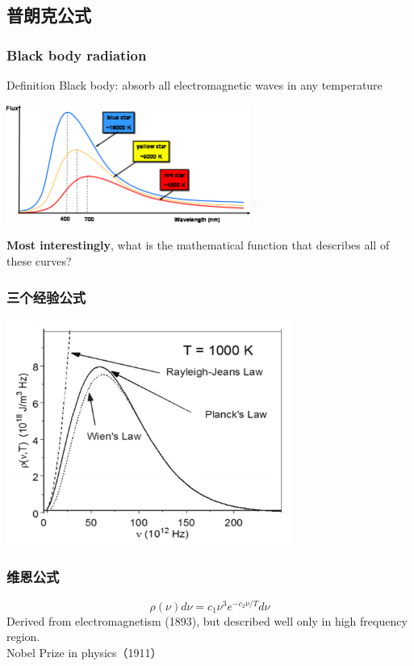 \subsection{普朗克公式}

\begin{frame}
    \frametitle{Black body radiation}
    \begin{tcolorbox1}{Definition}
    Black body:  absorb all electromagnetic waves in any temperature
    \end{tcolorbox1}
    \begin{center}
        \includegraphics[width=0.6\textwidth]{figs/blackbody_radn_curves.png}
    \end{center}
    \textbf{\color{deepred} Most interestingly}, what is the mathematical function that describes all of these curves?
\end{frame}

\begin{frame}
    \frametitle{三个经验公式}
    \begin{center}
        \includegraphics[width=0.7\textwidth]{figs/threelaws.png}
    \end{center}
\end{frame}

\begin{frame} [t]
    \frametitle{维恩公式}
    \begin{equation*}
        \rho(\nu) d \nu=c_{1} \nu^{3} e^{-c_{2} \nu / T} d \nu 
    \end{equation*}
    Derived from electromagnetism (1893), but described well only in high frequency region.\\ 
    {\color{deepred} Nobel Prize in physics（1911）}\\
\end{frame}

